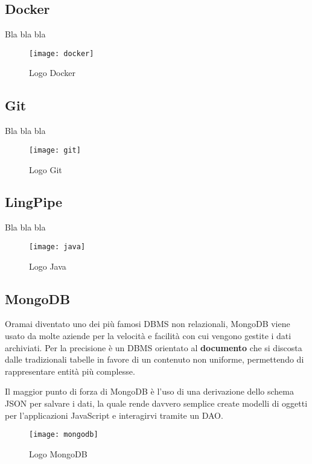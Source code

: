 \subsection{Docker}
Bla bla bla


\begin{figure}[H]
\begin{center}
\texttt{[image: docker]}
\caption{Logo Docker}
\label{fig:docker_logo}
\end{center}
\end{figure}

\subsection{Git}
Bla bla bla

\begin{figure}[H]
\begin{center}
\texttt{[image: git]}
\caption{Logo Git}
\label{fig:git_logo}
\end{center}
\end{figure}

\subsection{LingPipe}
Bla bla bla

\begin{figure}[H]
\begin{center}
\texttt{[image: java]}
\caption{Logo Java}
\label{fig:java_logo}
\end{center}
\end{figure}

\subsection{MongoDB}
Oramai diventato uno dei più famosi \gls{DBMS} non relazionali, MongoDB viene
usato da molte aziende per la velocità e facilità con cui vengono gestite i
dati archiviati. Per la precisione è un \gls{DBMS} orientato al
\textbf{documento} che si discosta dalle tradizionali tabelle in favore di un
contenuto non uniforme, permettendo di rappresentare entità più complesse.

Il maggior punto di forza di MongoDB è l'uso di una derivazione dello schema
\gls{JSON} per salvare i dati, la quale rende davvero semplice create modelli di
oggetti per l'applicazioni JavaScript e interagirvi tramite un \gls{DAO}.

\begin{figure}[h]
\begin{center}
\texttt{[image: mongodb]}
\caption{Logo MongoDB}
\label{fig:mongodb_logo}
\end{center}
\end{figure}

